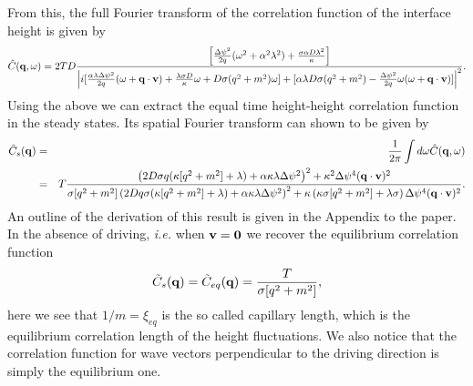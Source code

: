 From this, the full Fourier transform of the correlation function of the interface height is given by
\begin{equation}
    \hat C({\bf q},\omega)  = 2TD \frac{\left[ \frac{\Delta\psi^2}{2q}(\omega^2+\alpha^2 \lambda^2) + \frac{\sigma\alpha D\lambda^2}{\kappa}\right]}{\left|i[\frac{\alpha\lambda\Delta\psi^2}{2 q}(\omega + {\bf q}\cdot{\bf v}) + \frac{\lambda \sigma D}{\kappa}\omega + D\sigma(q^2+m^2)\omega]
+[\alpha\lambda D\sigma(q^2+m^2) -\frac{\Delta\psi^2}{2q}\omega(\omega+{\bf q}\cdot{\bf v})]\right|^2}.
\end{equation}
Using the above we can extract the equal time height-height correlation function in the steady states. Its spatial Fourier transform can shown to be given by
\begin{eqnarray}
\tilde C_s({\bf q}) &=& \frac{1}{2\pi} \int d\omega \hat C({\bf q}, \omega)\nonumber\\
&=&T \frac{\left(2 D\sigma q(\kappa[q^2+m^2]+\lambda)+\alpha\kappa\lambda\Delta\psi^2\right)^2 +\kappa^2 \Delta\psi^4 ({\bf q}\cdot{\bf v})^2}{\sigma[q^2+m^2]\left(2D q\sigma (\kappa[q^2+m^2]+\lambda)+\alpha \kappa\lambda \Delta\psi^2\right)^2 + \kappa\left(\kappa\sigma[q^2+m^2] + \lambda\sigma\right)\Delta\psi^4({\bf q}\cdot{\bf v})^2}.\label{eqmaind}
\end{eqnarray}
An outline of the derivation of this result is given in the Appendix to the paper.
In the absence of driving, {\em i.e.} when ${\bf v}={\bf 0}$ we recover the equilibrium correlation function
\begin{equation}
    \tilde C_s({\bf q})= \tilde C_{eq}({\bf q})= \frac{T}{\sigma[q^2+m^2]},
\end{equation} 
here we see that  $1/m= \xi_{eq}$ is the so called capillary length, which is the equilibrium correlation length of the height fluctuations. We also notice that the correlation function for wave vectors perpendicular to the driving direction is simply the equilibrium one.

